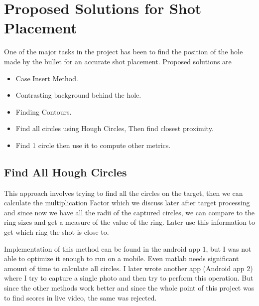 \documentclass[10pt,twocolumn,letterpaper]{article}
\begin{document}
\section{Proposed Solutions for Shot Placement}

One of the major tasks in the project has been to find the position of the hole made by the bullet for an accurate shot placement. Proposed solutions are 
\begin{itemize}
	\item Case Insert Method.
	\item Contrasting background behind the hole.
	\item Finding Contours.
	\item Find all circles using Hough Circles, Then find closest proximity.
	\item Find 1 circle then use it to compute other metrics.
\end{itemize}
\subsection{Find All Hough Circles}
This approach involves trying to find all the circles on the target, then we can calculate the multiplication Factor which we discuss later after target processing and since now we have all the radii of the captured circles, we can compare to the ring sizes and get a measure of the value of the ring. Later use this information to get which ring the shot is close to.

Implementation of this method can be found in the android app 1, but I was not able to optimize it enough to run on a mobile. Even matlab needs significant amount of time to calculate all circles. I later wrote another app (Android app 2) where I try to capture a single photo and then try to perform this operation. But since the other methods work better and since the whole point of this project was to find scores in live video, the same was rejected.
\end{document}
